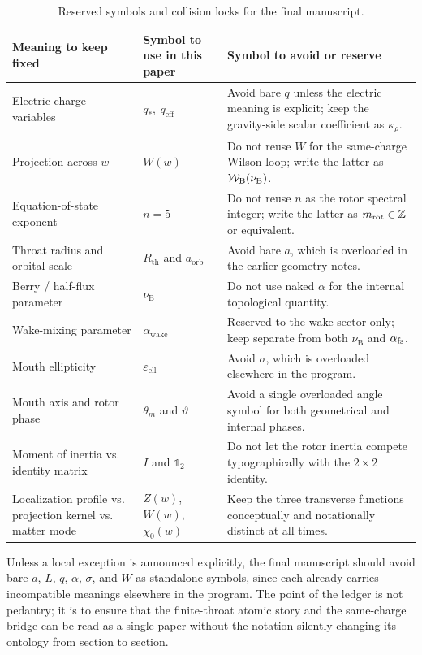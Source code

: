 \documentclass[11pt]{article}
\theoremstyle{plain}
\theoremstyle{definition}
\theoremstyle{remark}
\newcommand{\Rth}{R_{\mathrm{th}}}
\newcommand{\aorb}{a_{\mathrm{orb}}}
\newcommand{\nuB}{\nu_{\mathrm{B}}}
\newcommand{\epsell}{\varepsilon_{\mathrm{ell}}}
\newcommand{\throt}{\vartheta}
\newcommand{\thmouth}{\theta_m}
\newcommand{\qeff}{q_{\mathrm{eff}}}
\newcommand{\qstar}{q_*}
\newcommand{\alphawake}{\alpha_{\mathrm{wake}}}
\newcommand{\kapparho}{\kappa_{\rho}}
\begin{document}
\begin{table}[t]
\centering
\caption{Reserved symbols and collision locks for the final manuscript.}
\label{tab:notation-ledger-locks}
\begin{tabularx}{\textwidth}{@{}>{\raggedright\arraybackslash}p{} >{\raggedright\arraybackslash}p{} X@{}}
\toprule
Meaning to keep fixed & Symbol to use in this paper & Symbol to avoid or reserve \\
\midrule
Electric charge variables & $\qstar,\ \qeff$ & Avoid bare $q$ unless the electric meaning is explicit; keep the gravity-side scalar coefficient as $\kapparho$. \\
Projection across $w$ & $W(w)$ & Do not reuse $W$ for the same-charge Wilson loop; write the latter as $\mathcal W_{\rm B}(\nuB)$. \\
Equation-of-state exponent & $n=5$ & Do not reuse $n$ as the rotor spectral integer; write the latter as $m_{\rm rot}\in\mathbb Z$ or equivalent. \\
Throat radius and orbital scale & $\Rth$ and $\aorb$ & Avoid bare $a$, which is overloaded in the earlier geometry notes. \\
Berry / half-flux parameter & $\nuB$ & Do not use naked $\alpha$ for the internal topological quantity. \\
Wake-mixing parameter & $\alphawake$ & Reserved to the wake sector only; keep separate from both $\nuB$ and $\alpha_{\rm fs}$. \\
Mouth ellipticity & $\epsell$ & Avoid $\sigma$, which is overloaded elsewhere in the program. \\
Mouth axis and rotor phase & $\thmouth$ and $\throt$ & Avoid a single overloaded angle symbol for both geometrical and internal phases. \\
Moment of inertia vs.
identity matrix & $I$ and $\mathbb{1}_2$ & Do not let the rotor inertia compete typographically with the $2\times2$ identity. \\
Localization profile vs.
projection kernel vs.
matter mode & $Z(w)$, $W(w)$, $\chi_0(w)$ & Keep the three transverse functions conceptually and notationally distinct at all times. \\
\bottomrule
\end{tabularx}
\end{table}

Unless a local exception is announced explicitly, the final manuscript should avoid bare $a$, $L$, $q$, $\alpha$, $\sigma$, and $W$ as standalone symbols, since each already carries incompatible meanings elsewhere in the program. The point of the ledger is not pedantry; it is to ensure that the finite-throat atomic story and the same-charge bridge can be read as a single paper without the notation silently changing its ontology from section to section.
\end{document}
